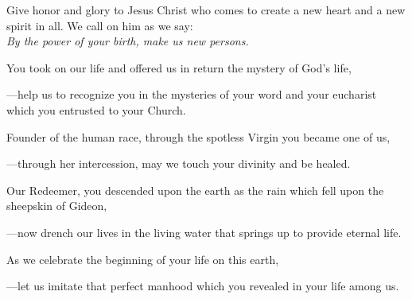 \intercessions\indent

\begin{hangpar}

Give honor and glory to Jesus Christ who comes to create a new heart and a new spirit in all. We call on him as we say:\\
\emph{By the power of your birth, make us new persons.}

\medskip You took on our life and offered us in return the mystery of God’s life,

{\color{red}---\thinspace}help us to recognize you in the mysteries of your word and your eucharist which you entrusted to your Church.

\medskip Founder of the human race, through the spotless Virgin you became one of us,

{\color{red}---\thinspace}through her intercession, may we touch your divinity and be healed.

\medskip Our Redeemer, you descended upon the earth as the rain which fell upon the sheepskin of Gideon,

{\color{red}---\thinspace}now drench our lives in the living water that springs up to provide eternal life.

\medskip As we celebrate the beginning of your life on this earth,

{\color{red}---\thinspace}let us imitate that perfect manhood which you revealed in your life among us.

\medskip

\end{hangpar}
